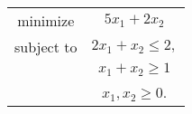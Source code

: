 \begin{tabular}{c c}
minimize & $5x_1 + 2x_2$\\
subject to & $2x_1 + x_2 \leq 2,$ \\
 & $x_1 + x_2 \geq 1$\\
 & $x_1 , x_2 \geq 0$.
\end{tabular}